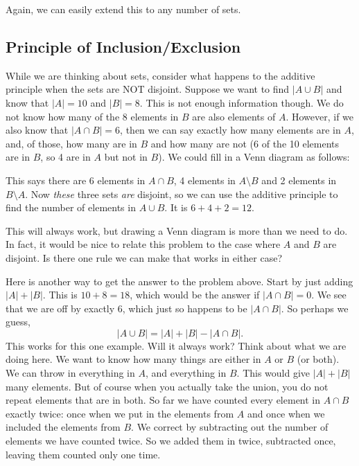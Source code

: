 \documentclass[12pt]{article}
\begin{document}
Again, we can easily extend this to any number of sets.

\subsection{Principle of Inclusion/Exclusion}\label{sec:PIE}

While we are thinking about sets, consider what happens to the additive principle when the sets are NOT disjoint. Suppose we want to find $|A \cup B|$ and know that $|A| = 10$ and $|B| = 8$.  This is not enough information though.  We do not know how many of the 8 elements in $B$ are also elements of $A$.  However, if we also know that $|A \cap B| = 6$, then we can say exactly how many elements are in $A$, and, of those, how many are in $B$ and how many are not (6 of the 10 elements are in $B$, so 4 are in $A$ but not in $B$).  We could fill in a Venn diagram  as follows:

\begin{center}



\end{center}

This says there are 6 elements in $A \cap B$, 4 elements in $A \setminus B$ and 2 elements in $B \setminus A$.  Now \emph{these} three sets \emph{are} disjoint, so we can use the additive principle to find the number of elements in $A \cup B$.  It is $6 + 4 + 2 = 12$.

This will always work, but drawing a Venn diagram is more than we need to do.  In fact, it would be nice to relate this problem to the case where $A$ and $B$ are disjoint.  Is there one rule we can make that works in either case?


Here is another way to get the answer to the problem above.  Start by just adding $|A| + |B|$.  This is $10 + 8 = 18$, which would be the answer if $|A \cap B| = 0$.  We see that we are off by exactly 6, which just so happens to be $|A \cap B|$.  So perhaps we guess,
\[|A \cup B| = |A| + |B| - |A \cap B|.\]
This works for this one example.  Will it always work?  Think about what we are doing here.  We want to know how many things are either in $A$ or $B$ (or both).  We can throw in everything in $A$, and everything in $B$.  This would give $|A| + |B|$ many elements.  But of course when you actually take the union, you do not repeat elements that are in both.  So far we have counted every element in $A \cap B$ exactly twice: once when we put in the elements from $A$ and once when we included the elements from $B$.  We correct by subtracting out the number of elements we have counted twice.  So we added them in twice, subtracted once, leaving them counted only one time.
\end{document}

